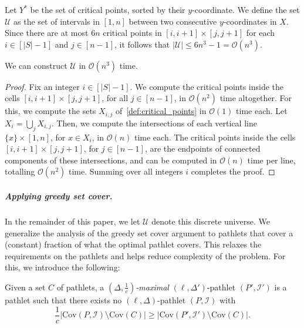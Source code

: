 \documentclass[a4paper,UKenglish,cleveref,thm-restate,notab]{lipics-v2021}
\newcommand{\bigO}{\mathcal{O}}
\newcommand{\I}{\mathcal{I}}
\newcommand{\U}{\mathcal{U}}
\newcommand{\Cov}{\ensuremath{\mathrm{Cov}}}
\begin{document}
    \begin{definition}
        Let $Y^*$ be the set of critical points, sorted by their $y$-coordinate. 
        We define the set $\U$ as the set of intervals in $[1, n]$ between two consecutive $y$-coordinates in $X$.
        Since there are at most $6n$ critical points in $[i, i+1] \times [j, j+1]$ for each $i \in [|S|-1]$ and $j \in [n-1]$, it follows that $|\U| \leq 6n^3-1 = \bigO(n^3)$. 
    \end{definition}

    \begin{lemma}
    \label{lem:constructing_universe}
        We can construct $\U$ in $\bigO(n^3)$ time.
    \end{lemma}
    \begin{proof}
        Fix an integer $i \in [|S|-1]$.
        We compute the critical points inside the cells $[i, i+1] \times [j, j+1]$, for all $j \in [n-1]$, in $\bigO(n^2)$ time altogether.
        For this, we compute the sets $X_{i, j}$ of~\cref{def:critical_points} in $\bigO(1)$ time each.
        Let $X_i = \bigcup_j X_{i, j}$.
        Then, we compute the intersections of each vertical line $\{x\} \times [1, n]$, for $x \in X_i$, in $\bigO(n)$ time each.
        The critical points inside the cells $[i, i+1] \times [j, j+1]$, for $j \in [n-1]$, are the endpoints of connected components of these intersections, and can be computed in $\bigO(n)$ time per line, totalling $\bigO(n^2)$ time.
        Summing over all integers $i$ completes the proof.
    \end{proof}
    



    \subparagraph{Applying greedy set cover.}
    In the remainder of this paper, we let $\U$ denote this discrete universe.
    We generalize the analysis of the greedy set cover argument to pathlets that cover a (constant) fraction of what the optimal pathlet covers.
    This relaxes the requirements on the pathlets and helps reduce complexity of the problem.
    For this, we introduce the following:

    \begin{definition}
        Given a set $C$ of pathlets, a \emph{$(\Delta, \frac{1}{c})$-maximal} $(\ell, \Delta')$-pathlet $(P', \I')$ is a pathlet such that there exists no $(\ell, \Delta)$-pathlet $(P, \I)$ with 
        \[
            \frac{1}{c} | \Cov(P, \I) \setminus \Cov(C) |  \geq | \Cov(P', \I') \setminus \Cov(C) |.
        \]
    \end{definition}
\end{document}
